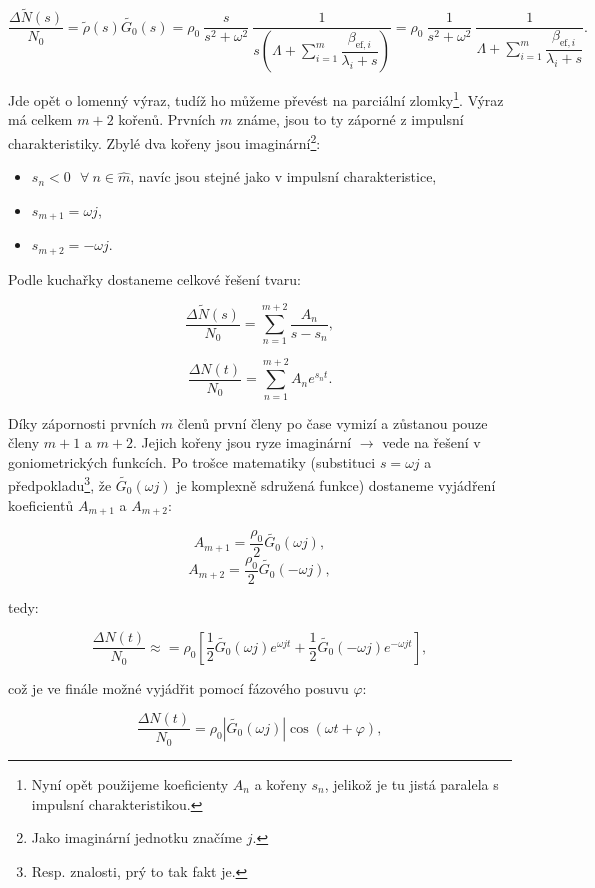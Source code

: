 $$ \dfrac{\Delta \tilde{N}(s)}{N_0} = \tilde{\rho}(s) \tilde{G_0}(s) = \rho_0 \: \dfrac{s}{s^2 + \omega^2} \: \dfrac{1}{s \left ( \Lambda + \sum_{i=1}^m \dfrac{\beta_{\text{ef},i}}{\lambda_i + s} \right )} = \rho_0 \: \dfrac{1}{s^2 + \omega^2} \: \dfrac{1}{\Lambda + \sum_{i=1}^m \dfrac{\beta_{\text{ef},i}}{\lambda_i + s}}. $$

Jde opět o lomenný výraz, tudíž ho můžeme převést na parciální zlomky\footnote{Nyní opět použijeme koeficienty $A_n$ a kořeny $s_n$, jelikož je tu jistá paralela s impulsní charakteristikou.}. Výraz má celkem $m+2$ kořenů. Prvních $m$ známe, jsou to ty záporné z impulsní charakteristiky. Zbylé dva kořeny jsou imaginární\footnote{Jako imaginární jednotku značíme $j$.}:

\begin{itemize}
  \item $s_n < 0 \: \: \: \forall \: n \in \widehat{m}$, navíc jsou stejné jako v impulsní charakteristice,
  \item $s_{m+1} = \omega j$,
  \item $s_{m+2} = - \omega j$.
\end{itemize}

Podle kuchařky dostaneme celkové řešení tvaru:

$$ \dfrac{\Delta \tilde{N}(s)}{N_0} = \sum_{n = 1}^{m+2} \dfrac{A_n}{s-s_n}, $$

$$ \dfrac{\Delta N(t)}{N_0} = \sum_{n = 1}^{m+2} A_n e^{s_n t}. $$

Díky zápornosti prvních $m$ členů první členy po čase vymizí a zůstanou pouze členy $m+1$ a $m+2$. Jejich kořeny jsou ryze imaginární $\rightarrow$ vede na řešení v goniometrických funkcích. Po trošce matematiky (substituci $s = \omega j$ a předpokladu\footnote{Resp. znalosti, prý to tak fakt je.}, že $\tilde{G_0}(\omega j)$ je komplexně sdružená funkce) dostaneme vyjádření koeficientů $A_{m+1}$ a $A_{m+2}$:

$$ A_{m+1} = \dfrac{\rho_0}{2} \tilde{G_0}(\omega j), $$
$$ A_{m+2} = \dfrac{\rho_0}{2} \tilde{G_0}(-\omega j), $$

tedy:

$$ \dfrac{\Delta N(t)}{N_0} \approx = \rho_0 \left [\dfrac{1}{2} \tilde{G_0}(\omega j) e^{\omega j t} + \dfrac{1}{2} \tilde{G_0}(-\omega j) e^{-\omega j t} \right ], $$

což je ve finále možné vyjádřit pomocí fázového posuvu $\varphi$:

\begin{equation}
  \boxed{
  \dfrac{\Delta N(t)}{N_0} = \rho_0 | \tilde{G_0}(\omega j) | \cos (\omega t + \varphi),
  \label{frekvencni_charakteristika_reseni}}
\end{equation}

